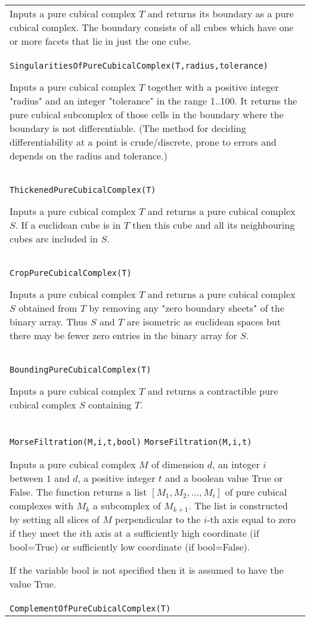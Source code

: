 \documentclass[a4paper,11pt]{report}
\begin{document}
{\begin{center}
\begin{tabular}{|l|}
 Inputs a pure cubical complex $T$ and returns its boundary as a pure cubical complex. The boundary consists of
all cubes which have one or more facets that lie in just the one cube. \\
 \index{SingularitiesOfPureCubicalComplex} \texttt{SingularitiesOfPureCubicalComplex(T,radius,tolerance)} 

 Inputs a pure cubical complex $T$ together with a positive integer "radius" and an integer "tolerance" in the
range 1..100. It returns the pure cubical subcomplex of those cells in the
boundary where the boundary is not differentiable. (The method for deciding
differentiability at a point is crude/discrete, prone to errors and depends on
the radius and tolerance.) \\
 \index{ThickenedPureCubicalComplex} \texttt{ThickenedPureCubicalComplex(T)} 

 Inputs a pure cubical complex $T$ and returns a pure cubical complex $S$. If a euclidean cube is in $T$ then this cube and all its neighbouring cubes are included in $S$. \\
 \index{CropPureCubicalComplex} \texttt{CropPureCubicalComplex(T)} 

 Inputs a pure cubical complex $T$ and returns a pure cubical complex $S$ obtained from $T$ by removing any "zero boundary sheets" of the binary array. Thus $S$ and $T$ are isometric as euclidean spaces but there may be fewer zero entries in the
binary array for $S$. \\
 \index{BoundingPureCubicalComplex} \texttt{BoundingPureCubicalComplex(T)} 

 Inputs a pure cubical complex $T$ and returns a contractible pure cubical complex $S$ containing $T$. \\
 \index{MorseFiltration} \texttt{MorseFiltration(M,i,t,bool)} \texttt{MorseFiltration(M,i,t)} 

 Inputs a pure cubical complex $M$ of dimension $d$, an integer $i$ between $1$ and $d$, a positive integer $t$ and a boolean value True or False. The function returns a list $[M_1, M_2, ..., M_t]$ of pure cubical complexes with $M_k$ a subcomplex of $M_{k+1}$. The list is constructed by setting all slices of $M$ perpendicular to the $i$-th axis equal to zero if they meet the $i$th axis at a sufficiently high coordinate (if bool=True) or sufficiently low
coordinate (if bool=False). 

 If the variable bool is not specified then it is assumed to have the value
True. \\
 \index{ComplementOfPureCubicalComplex} \texttt{ComplementOfPureCubicalComplex(T)} 


\end{tabular}
\end{center}}
\end{document}
